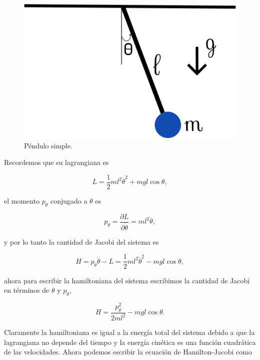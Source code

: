 \documentclass[a4paper,10pt]{article}
\numberwithin{equation}{section}
\begin{document}
\begin{figure}[H]
 \center 
 \includegraphics[scale=0.4]{problema5fig1}
 \caption{Péndulo simple.}
 \label{fig:problema5fig1}
\end{figure}

Recordemos que su lagrangiana es 

\begin{equation}
 L = \frac{1}{2}ml^2\dot{\theta}^2 + mgl\cos{\theta},
\end{equation}

el momento $p_\theta$ conjugado a $\theta$ es 

\begin{equation}
 p_\theta = \frac{\partial L}{\partial \dot{\theta}} = ml^2\dot{\theta},
\end{equation}

y por lo tanto la cantidad de Jacobi del sistema es 

\begin{equation}
 H = p_\theta \dot{\theta} - L = \frac{1}{2}ml^2\dot{\theta}^2 - mgl\cos{\theta},
\end{equation}

ahora para escribir la hamiltoniana del sistema escribimos la cantidad de Jacobi 
en términos de $\theta$ y $p_\theta$, 

\begin{equation}
 H = \frac{p_\theta^2}{2ml^2} - mgl\cos{\theta}.
\end{equation}

Claramente la hamiltoniana es igual a la energía total del sistema debido a que 
la lagrangiana no depende del tiempo y la energía cinética es una función cuadrática 
de las velocidades. Ahora podemos escribir la ecuación de Hamilton-Jacobi como 
\end{document}
